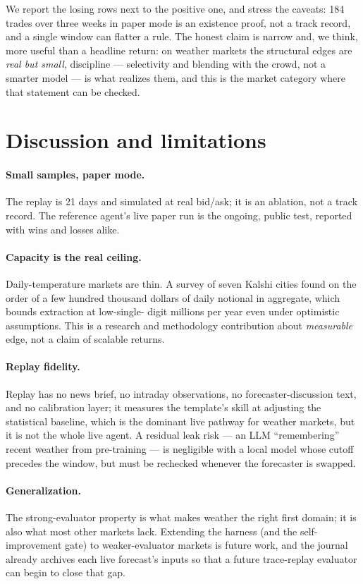 \documentclass[10pt,twocolumn]{article}
\begin{document}
We report the losing rows next to the positive one, and stress the caveats: 184
trades over three weeks in paper mode is an existence proof, not a track record,
and a single window can flatter a rule. The honest claim is narrow and, we think,
more useful than a headline return: on weather markets the structural edges are
\emph{real but small}, discipline --- selectivity and blending with the crowd, not
a smarter model --- is what realizes them, and this is the market category where
that statement can be checked.

\section{Discussion and limitations}

\paragraph{Small samples, paper mode.} The replay is 21 days and simulated at
real bid/ask; it is an ablation, not a track record. The reference agent's live
paper run is the ongoing, public test, reported with wins and losses alike.

\paragraph{Capacity is the real ceiling.} Daily-temperature markets are thin.
A survey of seven Kalshi cities found on the order of a few hundred thousand
dollars of daily notional in aggregate, which bounds extraction at low-single-
digit millions per year even under optimistic assumptions. This is a research and
methodology contribution about \emph{measurable} edge, not a claim of scalable
returns.

\paragraph{Replay fidelity.} Replay has no news brief, no intraday observations,
no forecaster-discussion text, and no calibration layer; it measures the
template's skill at adjusting the statistical baseline, which is the dominant live
pathway for weather markets, but it is not the whole live agent. A residual leak
risk --- an LLM ``remembering'' recent weather from pre-training --- is negligible
with a local model whose cutoff precedes the window, but must be rechecked
whenever the forecaster is swapped.

\paragraph{Generalization.} The strong-evaluator property is what makes weather
the right first domain; it is also what most other markets lack. Extending the
harness (and the self-improvement gate) to weaker-evaluator markets is future
work, and the journal already archives each live forecast's inputs so that a
future trace-replay evaluator can begin to close that gap.
\end{document}
